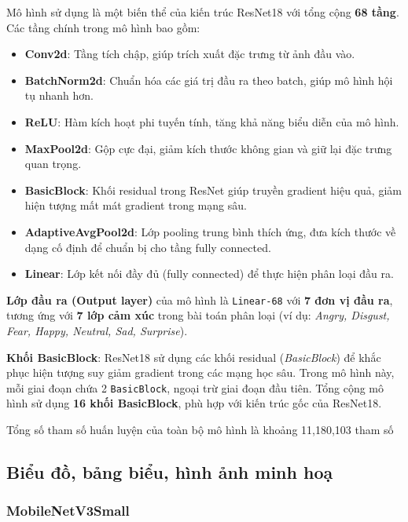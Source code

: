 Mô hình sử dụng là một biến thể của kiến trúc ResNet18 với tổng cộng \textbf{68 tầng}. Các tầng chính trong mô hình bao gồm:

\begin{itemize}
    \item \textbf{Conv2d}: Tầng tích chập, giúp trích xuất đặc trưng từ ảnh đầu vào.
    \item \textbf{BatchNorm2d}: Chuẩn hóa các giá trị đầu ra theo batch, giúp mô hình hội tụ nhanh hơn.
    \item \textbf{ReLU}: Hàm kích hoạt phi tuyến tính, tăng khả năng biểu diễn của mô hình.
    \item \textbf{MaxPool2d}: Gộp cực đại, giảm kích thước không gian và giữ lại đặc trưng quan trọng.
    \item \textbf{BasicBlock}: Khối residual trong ResNet giúp truyền gradient hiệu quả, giảm hiện tượng mất mát gradient trong mạng sâu.
    \item \textbf{AdaptiveAvgPool2d}: Lớp pooling trung bình thích ứng, đưa kích thước về dạng cố định để chuẩn bị cho tầng fully connected.
    \item \textbf{Linear}: Lớp kết nối đầy đủ (fully connected) để thực hiện phân loại đầu ra.
\end{itemize}

\vspace{0.5em}
\noindent \textbf{Lớp đầu ra (Output layer)} của mô hình là \texttt{Linear-68} với \textbf{7 đơn vị đầu ra}, tương ứng với \textbf{7 lớp cảm xúc} trong bài toán phân loại (ví dụ: \textit{Angry, Disgust, Fear, Happy, Neutral, Sad, Surprise}).

\vspace{0.5em}
\noindent \textbf{Khối BasicBlock}: ResNet18 sử dụng các khối residual (\textit{BasicBlock}) để khắc phục hiện tượng suy giảm gradient trong các mạng học sâu. Trong mô hình này, mỗi giai đoạn chứa 2 \texttt{BasicBlock}, ngoại trừ giai đoạn đầu tiên. Tổng cộng mô hình sử dụng \textbf{16 khối BasicBlock}, phù hợp với kiến trúc gốc của ResNet18.

Tổng số tham số huấn luyện của toàn bộ mô hình là khoảng 11,180,103 tham số

\subsection{Biểu đồ, bảng biểu, hình ảnh minh hoạ} %

\subsubsection{MobileNetV3Small}

